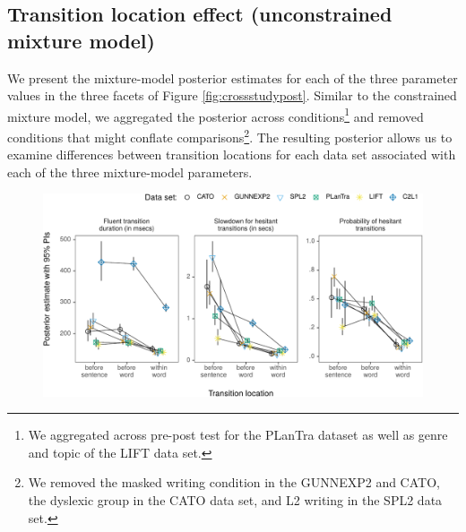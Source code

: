 \documentclass[
  english,
  man,floatsintext]{apa7}
\begin{document}
\begin{appendix}
\begin{center}
\begin{ThreePartTable}
{}

\end{ThreePartTable}
\end{center}
\end{appendix}

\clearpage
\makeatletter
\efloat@restorefloats
\makeatother


\begin{appendix}
\section{}
\hypertarget{transition-location-effect-unconstrained-mixture-model}{%
\subsection{Transition location effect (unconstrained mixture
model)}\label{transition-location-effect-unconstrained-mixture-model}}

We present the mixture-model posterior estimates for each of the three
parameter values in the three facets of Figure \ref{fig:crossstudypost}.
Similar to the constrained mixture model, we aggregated the posterior
across conditions\footnote{We aggregated across pre-post test for the
  PLanTra dataset as well as genre and topic of the LIFT data set.} and
removed conditions that might conflate comparisons\footnote{We removed
  the masked writing condition in the GUNNEXP2 and CATO, the dyslexic
  group in the CATO data set, and L2 writing in the SPL2 data set.}. The
resulting posterior allows us to examine differences between transition
locations for each data set associated with each of the three
mixture-model parameters.

\begin{figure}

{\centering \includegraphics{manuscript_files/figure-latex/crossstudypost-1} 

}
\end{figure}
\end{appendix}
\end{document}
